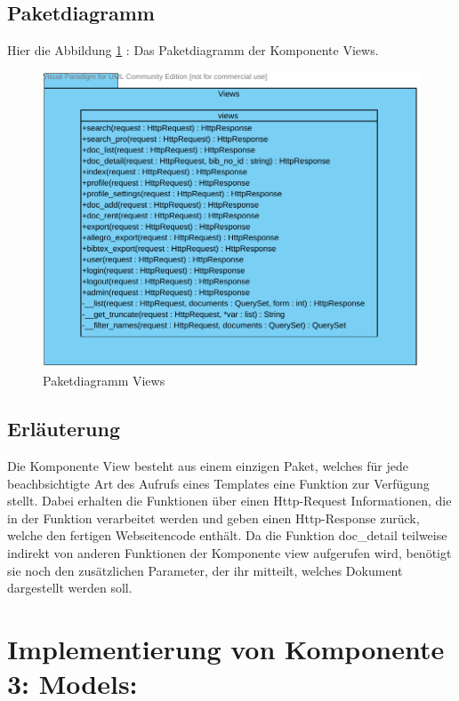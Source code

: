 \subsection{Paketdiagramm}
Hier die Abbildung \ref{fig:PDviews} : Das Paketdiagramm der Komponente Views.
\begin{figure}[!htb]
\includegraphics[width=0.8\linewidth]{bilder/Paketdiagramm_views.pdf}
\caption{Paketdiagramm Views}
\label{fig:PDviews}
\end{figure}
\subsection{Erl\"auterung}
Die Komponente View besteht aus einem einzigen Paket, welches für jede
beachbsichtigte Art des Aufrufs eines Templates eine Funktion zur Verfügung
stellt. Dabei erhalten die Funktionen über einen Http-Request Informationen, die
in der Funktion verarbeitet werden und geben einen Http-Response zurück, welche
den fertigen Webseitencode enthält. Da die Funktion doc\_detail
teilweise indirekt von anderen Funktionen der Komponente view aufgerufen wird,
benötigt sie noch den zusätzlichen Parameter, der ihr mitteilt, welches Dokument
dargestellt werden soll.


\section{Implementierung von Komponente
         3: Models:}


